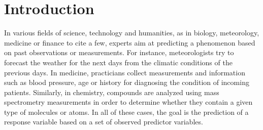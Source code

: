 \chapter{Introduction}\label{ch:introduction}

In various fields of science, technology and humanities, as in biology,
meteorology, medicine or finance to cite a few, experts aim at predicting a
phenomenon based on past observations or measurements. For instance,
meteorologists try to forecast the weather for the next days from the climatic
conditions of the previous days. In medicine, practicians collect measurements
and information such as blood pressure, age or history for diagnosing the
condition of incoming patients. Similarly, in chemistry, compounds are analyzed
using mass spectrometry measurements in order to determine whether they contain
a given type of molecules or atoms. In all of these cases, the goal is
the prediction of a response variable based on a set of observed predictor
variables.

